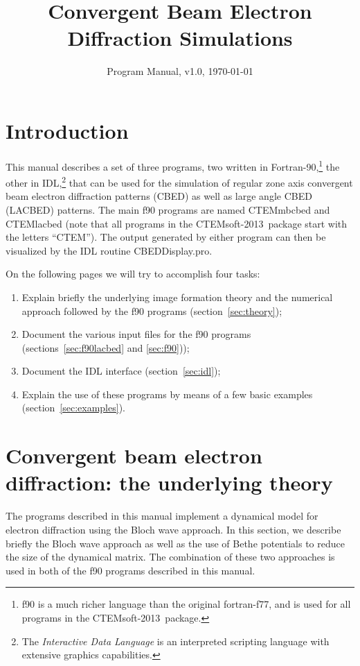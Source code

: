 \documentclass[DIV=calc, paper=letter, fontsize=11pt]{scrartcl}	 %
\title{Convergent Beam Electron\\ Diffraction Simulations} %
\author{\vspace*{-0.7in}} %
\date{Program Manual, v1.0, \today}
\newcommand{\ctp}{\textsf{CTEMsoft-2013}}
\begin{document}
\maketitle

\begin{figure*}[h]
\leavevmode\centering
{}
\end{figure*}

\renewcommand{\contentsname}{Table of Contents}
{\small\tableofcontents}

\newpage
\section{Introduction}
This manual describes a set of three programs, 
two written in Fortran-90,\footnote{f90 is a much richer language than the original fortran-f77, and is
used for all programs in the \ctp\ package.} 
the other in IDL,\footnote{The \textit{Interactive Data Language} is an interpreted scripting language with extensive graphics capabilities.} 
that can be used for the simulation of regular zone axis convergent beam electron diffraction patterns (CBED) as 
well as large angle CBED (LACBED) patterns.  The main f90 programs
are named \textsf{CTEMmbcbed} and \textsf{CTEMlacbed} (note that all programs in the \ctp\ package start with the letters ``CTEM'').
The output generated by either program can then be visualized by the IDL routine \textsf{CBEDDisplay.pro}.  

On the following pages we will try to accomplish four tasks:
\begin{enumerate}
	\item Explain briefly the underlying image formation theory and the numerical approach followed by the f90 programs (section~\ref{sec:theory});
	\item Document the various input files for the f90 programs (sections~\ref{sec:f90lacbed} and \ref{sec:f90}));
	\item Document the IDL interface (section~\ref{sec:idl});
	\item Explain the use of these programs by means of a few basic examples (section~\ref{sec:examples}).
\end{enumerate}



\newpage
\section{Convergent beam electron diffraction: the underlying theory\label{sec:theory}}
The programs described in this manual implement a dynamical model for electron diffraction using the 
Bloch wave approach.  In this section, we describe briefly the Bloch wave approach as well as the 
use of Bethe potentials to reduce the size of the dynamical matrix.  The combination of these 
two approaches is used in both of the f90 programs described in this manual.
\end{document}
